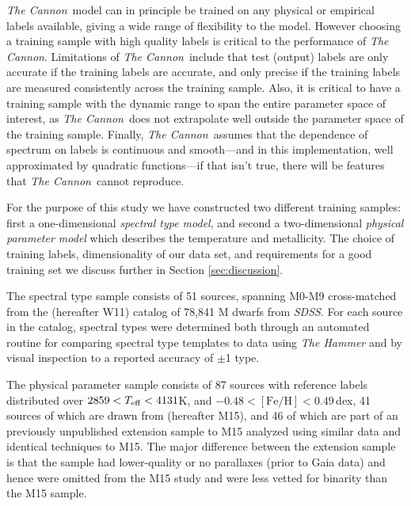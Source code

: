 \documentclass[modern]{aastex62}
\newcommand{\thecannon}{\textsl{The Cannon}}
\newcommand{\sdss}{\textsl{SDSS}}
\newcommand{\feh}{[{\mathrm{Fe}/\mathrm{H}}]}
\begin{document}
\thecannon\ model can in principle be trained on any physical or empirical labels available, giving a wide range of flexibility to the model. However choosing a training sample with high quality labels is critical to the performance of \thecannon.
Limitations of \thecannon\ include that test (output) labels are only accurate if the training labels are accurate, and only precise if the training labels are measured consistently across the training sample.
Also, it is critical to have a training sample with the dynamic range to span the entire parameter space of interest, as \thecannon\ does not extrapolate well outside the parameter space of the training sample.
Finally, \thecannon\ assumes that the dependence of spectrum on labels is continuous and smooth---and in this implementation, well approximated by quadratic functions---if that isn't true, there will be features that \thecannon\ cannot reproduce.

For the purpose of this study we have constructed two different training samples: first a one-dimensional \emph{spectral type model}, and second a two-dimensional \emph{physical parameter model} which describes the temperature and metallicity. The choice of training labels, dimensionality of our data set, and requirements for a good training set we discuss further in Section \ref{sec:discussion}.

The spectral type sample consists of 51 sources, spanning M0-M9 cross-matched from the \citealt{West:2011} (hereafter W11) catalog of 78,841 M dwarfs from \sdss. For each source in the catalog, spectral types were determined both through an automated routine for comparing spectral type templates to data using \textsl{The Hammer} \citep{Covey:2007} and by visual inspection to a reported accuracy of $\pm$1 type.

The physical parameter sample consists of 87 sources with reference labels distributed over $2859 <T_{\rm eff} < 4131$K, and $-0.48 < \feh < 0.49$\,dex, 41 sources of which are drawn from \citealt{Mann:2015} (hereafter M15), and 46 of which are part of an previously unpublished extension sample to M15 analyzed using similar data and identical techniques to M15. The major difference between the extension sample is that the sample had lower-quality or no parallaxes (prior to Gaia data) and hence were omitted from the M15 study and were less vetted for binarity than the M15 sample.
\end{document}

